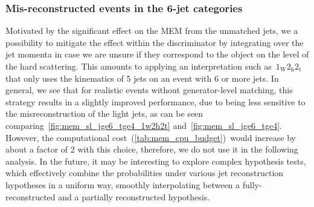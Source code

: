 \subsubsection{Mis-reconstructed events in the 6-jet categories}
Motivated by the significant effect on the MEM from the unmatched jets, we a possibility to mitigate the effect within the discriminator by integrating over the jet momenta in case we are unsure if they correspond to the object on the level of the hard scattering. This amounts to applying an interpretation such as~$1_{\mathrm{W}} 2_{\mathrm{h}} 2_{\mathrm{t}}$ that only uses the kinematics of 5 jets on an event with 6 or more jets. In general, we see that for realistic events without generator-level matching, this strategy results in a slightly improved performance, due to being less sensitive to the misreconstruction of the light jets, as can be seen comparing~\cref{fig:mem_sl_jge6_tge4_1w2h2t} and~\cref{fig:mem_sl_jge6_tge4}. However, the computational cost~(\cref{tab:mem_cpu_budget})~would increase by about a factor of 2 with this choice, therefore, we do not use it in the following analysis. In the future, it may be interesting to explore complex hypothesis tests, which effectively combine the probabilities under various jet reconstruction hypotheses in a uniform way, smoothly interpolating between a fully-reconstructed and a partially reconstructed hypothesis.

